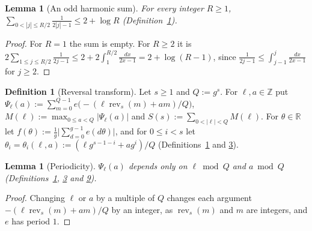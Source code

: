 \documentclass[11pt]{article}
\newcounter{hffc}
\theoremstyle{definition}\newtheorem{hffdef}[hffc]{Definition}
\theoremstyle{plain}\newtheorem{hfflem}[hffc]{Lemma}\newtheorem{hffthm}[hffc]{Theorem}
\theoremstyle{remark}\newtheorem{hffrem}[hffc]{Remark}
\newcommand{\hffcost}{}
\newcommand{\setcost}[1]{\renewcommand{\hffcost}{#1}}
\newcommand{\rev}{\operatorname{rev}}
\newcommand{\Z}{\mathbb{Z}}\newcommand{\R}{\mathbb{R}}\newcommand{\N}{\mathbb{N}}
\begin{document}
\begin{hfflem}[An odd harmonic sum]\label{L:harm}
For every integer $R\ge1$, $\sum_{0<|j|\le R/2}\frac1{2|j|-1}\le2+\log R$ (Definition~\hyperref[D:conv]{1}).
\par\nopagebreak{}
\end{hfflem}
\begin{proof}\setcost{length 97/300}For $R=1$ the sum is empty. For $R\ge2$ it is $2\sum_{1\le j\le R/2}\frac1{2j-1}\le 2+2\int_1^{R/2}\frac{dx}{2x-1}=2+\log(R-1)$, since $\frac1{2j-1}\le\int_{j-1}^{j}\frac{dx}{2x-1}$ for $j\ge2$.
\end{proof}

\begin{hffdef}[Reversal transform]\label{D:psi}
Let $s\ge1$ and $Q:=g^s$. For $\ell,a\in\Z$ put $\Psi_\ell(a):=\sum_{m=0}^{Q-1}e\bigl(-(\ell\rev_s(m)+am)/Q\bigr)$, $M(\ell):=\max_{0\le a<Q}|\Psi_\ell(a)|$ and $S(s):=\sum_{0<|\ell|<Q}M(\ell)$. For $\theta\in\R$ let $f(\theta):=\frac1g\bigl|\sum_{d=0}^{g-1}e(d\theta)\bigr|$, and for $0\le i<s$ let $\theta_i=\theta_i(\ell,a):=(\ell g^{s-1-i}+ag^i)/Q$ (Definitions~\hyperref[D:conv]{1} and \hyperref[D:digits]{3}).
\par\nopagebreak{}
\end{hffdef}

\begin{hfflem}[Periodicity]\label{L:per}
$\Psi_\ell(a)$ depends only on $\ell\bmod Q$ and $a\bmod Q$ (Definitions~\hyperref[D:conv]{1}, \hyperref[D:digits]{3} and \hyperref[D:psi]{9}).
\par\nopagebreak{}
\end{hfflem}
\begin{proof}\setcost{length 113/300}Changing $\ell$ or $a$ by a multiple of $Q$ changes each argument $-(\ell\rev_s(m)+am)/Q$ by an integer, as $\rev_s(m)$ and $m$ are integers, and $e$ has period $1$.
\end{proof}
\end{document}
